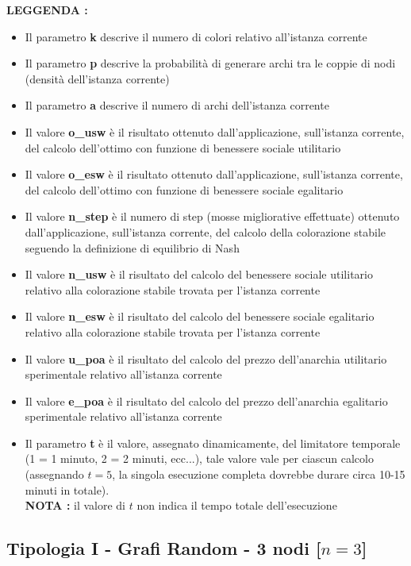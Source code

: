 \textbf{LEGGENDA : }

\begin{itemize}
	\item Il parametro \textbf{k} descrive il numero di colori relativo all'istanza corrente
	\item Il parametro \textbf{p} descrive la probabilità di generare archi tra le coppie di nodi (densità dell'istanza corrente)
	\item Il parametro \textbf{a} descrive il numero di archi dell'istanza corrente
	\item Il valore \textbf{o\_usw} è il risultato ottenuto dall'applicazione, sull'istanza corrente, del calcolo dell'ottimo con funzione di benessere sociale utilitario
	\item Il valore \textbf{o\_esw} è il risultato ottenuto dall'applicazione, sull'istanza corrente, del calcolo dell'ottimo con funzione di benessere sociale egalitario
	\item Il valore \textbf{n\_step} è il numero di step (mosse migliorative effettuate) ottenuto dall'applicazione, sull'istanza corrente, del calcolo della colorazione stabile seguendo la definizione di equilibrio di Nash
	\item Il valore \textbf{n\_usw} è il risultato del calcolo del benessere sociale utilitario relativo alla colorazione stabile trovata per l'istanza corrente
	\item Il valore \textbf{n\_esw} è il risultato del calcolo del benessere sociale egalitario relativo alla colorazione stabile trovata per l'istanza corrente
	\item Il valore \textbf{u\_poa} è il risultato del calcolo del prezzo dell'anarchia utilitario sperimentale relativo all'istanza corrente
	\item Il valore \textbf{e\_poa} è il risultato del calcolo del prezzo dell'anarchia egalitario sperimentale relativo all'istanza corrente
	\item Il parametro \textbf{t} è il valore, assegnato dinamicamente, del limitatore temporale (1 = 1 minuto, 2 = 2 minuti, ecc...), tale valore vale per ciascun calcolo (assegnando \(t = 5\), la singola esecuzione completa dovrebbe durare circa 10-15 minuti in totale).\\
	\textbf{NOTA :} il valore di $t$ non indica il tempo totale dell'esecuzione
\end{itemize}

\subsection{Tipologia I - Grafi Random - 3 nodi [$n=3$]}

